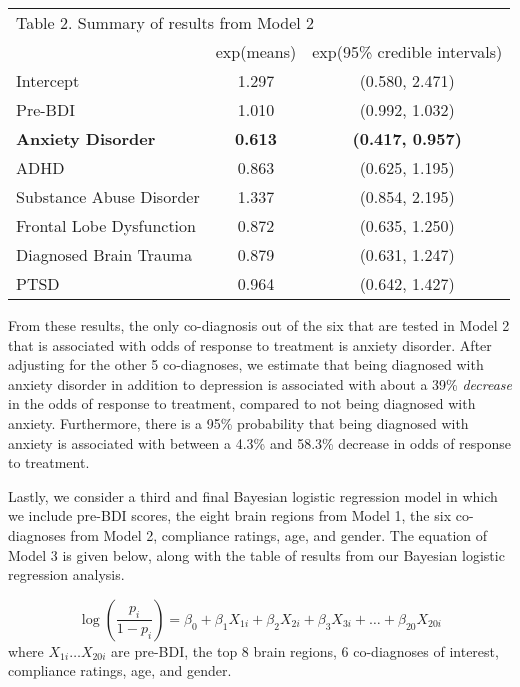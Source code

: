 \documentclass[12pt,doc]{apa}
\begin{document}
\begin{tabular}{l c c}
\multicolumn{3}{l}{Table 2. Summary of results from Model 2} \\

& exp(means) & exp(95\% credible intervals) \\
\hline
Intercept & 1.297 & (0.580, 2.471) \\
Pre-BDI & 1.010 & (0.992, 1.032) \\
\textbf{Anxiety Disorder} & \textbf{0.613} & \textbf{(0.417, 0.957)} \\
ADHD & 0.863 & (0.625, 1.195) \\
Substance Abuse Disorder & 1.337 & (0.854, 2.195) \\
Frontal Lobe Dysfunction & 0.872 & (0.635, 1.250) \\
Diagnosed Brain Trauma & 0.879 & (0.631, 1.247) \\
PTSD & 0.964 & (0.642, 1.427) \\

\end{tabular}

From these results, the only co-diagnosis out of the six that are tested in Model 2 that is associated with odds of response to treatment is anxiety disorder. After adjusting for the other 5 co-diagnoses, we estimate that being diagnosed with anxiety disorder in addition to depression is associated with about a 39\% \emph{decrease} in the odds of response to treatment, compared to not being diagnosed with anxiety. Furthermore, there is a 95\% probability that being diagnosed with anxiety is associated with between a 4.3\% and 58.3\% decrease in odds of response to treatment.

Lastly, we consider a third and final Bayesian logistic regression model in which we include pre-BDI scores, the eight brain regions from Model 1, the six co-diagnoses from Model 2, compliance ratings, age, and gender. The equation of Model 3 is given below, along with the table of results from our Bayesian logistic regression analysis.

\begin{equation}
\log \left( \frac{p_{i}}{1-p_{i}} \right) = \beta_{0} + \beta_{1}X_{1i} + \beta_{2}X_{2i} + \beta_{3}X_{3i} + \ldots + \beta_{20}X_{20i}
\end{equation}
where $X_{1i} \ldots X_{20i}$ are pre-BDI, the top 8 brain regions, 6 co-diagnoses of interest, compliance ratings, age, and gender.
\medskip
\end{document}
